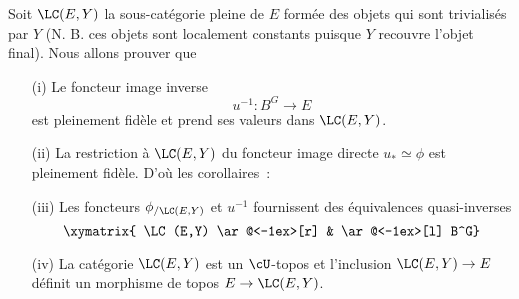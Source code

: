 Soit $\LC(E, Y)$ la sous-catégorie pleine de $E$ formée des objets qui sont trivialisés par $Y$ (N. B. ces objets sont localement constants puisque $Y$ recouvre l'objet final). Nous allons prouver que
\begin{enumerate}
    \item[(i)] Le foncteur image inverse
    $$
    u^{-1}: B^G \to E
    $$
    est pleinement fidèle et prend ses valeurs dans $\LC(E, Y)$.
    \item[(ii)] La restriction à $\LC(E, Y)$ du foncteur image directe $u_*\simeq\phi$ est pleinement fidèle.
    D'où les corollaires~:
    \item[(iii)] Les foncteurs $\phi_{/\LC(E, Y)}$ et $u^{-1}$ fournissent des équivalences quasi-inverses
    $$
    \xymatrix{ \LC(E,Y) \ar@<-1ex>[r]  & \ar@<-1ex>[l] B^G}
    $$
    \item[(iv)] La catégorie $\LC(E, Y)$ est un $\cU$-topos et l'inclusion $\LC(E, Y) \to E$ définit un morphisme de topos $E \to \LC(E, Y)$.
\end{enumerate}

